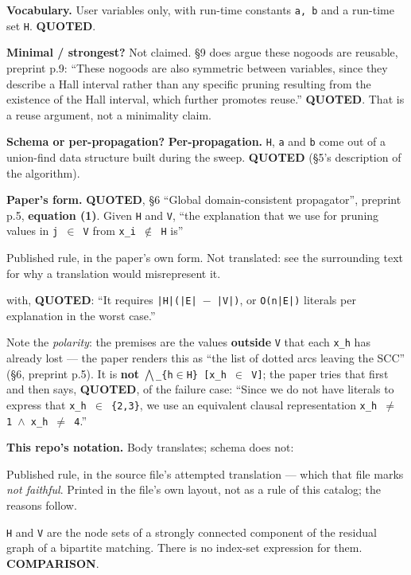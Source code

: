 \documentclass[10pt,a4paper]{article}
\newcommand{\provtag}[2]{{\small\sffamily\bfseries\textcolor{#1}{#2}}}
\newenvironment{pubblock}{%
  \par\smallskip
  \def\FrameCommand{\textcolor{litbar}{\vrule width 2.5pt}\hspace{9pt}}%
  \MakeFramed{\advance\hsize-\width\FrameRestore}}%
  {\endMakeFramed\par\smallskip}
\newcommand{\litsub}[1]{\par\smallskip{\sffamily\bfseries\textcolor{litbar}{#1}\par}}
\newcommand{\rulekind}[1]{\par{\small\sffamily\textcolor{litbar}{#1}\par}}
\newcommand{\litline}[1]{\noindent
  \resizebox{\ifdim\width>\linewidth\linewidth\else\width\fi}{!}{#1}\par}
\begin{document}
\begin{pubblock}
\textbf{Vocabulary.} User variables only, with run-time constants \texttt{a, b} and a run-time set \texttt{H}. \provtag{tagquoted}{QUOTED}.

\textbf{Minimal / strongest?} Not claimed. \S{}9 does argue these nogoods are reusable, preprint p.9: ``These nogoods are also symmetric between variables, since they describe a Hall interval rather than any specific pruning resulting from the existence of the Hall interval, which further promotes reuse.'' \provtag{tagquoted}{QUOTED}. That is a reuse argument, not a minimality claim.

\textbf{Schema or per-propagation?} \textbf{Per-propagation.} \texttt{H}, \texttt{a} and \texttt{b} come out of a union-find data structure built during the sweep. \provtag{tagquoted}{QUOTED} (\S{}5's description of the algorithm).

\par\smallskip
\litsub{Rule 3 --- domain-consistent propagator (R\'egin / SCC), pruning}
\textbf{Paper's form.} \provtag{tagquoted}{QUOTED}, \S{}6 ``Global domain-consistent propagator'', preprint p.5, \textbf{equation (1)}. Given \texttt{H} and \texttt{V}, ``the explanation that we use for pruning values in \texttt{j $\in$ V} from \texttt{x\_i $\notin$ H} is''

\rulekind{Published rule, in the paper's own form. Not translated: see the surrounding text for why a translation would misrepresent it.}
{\raggedright
\litline{\ttfamily\small $\bigwedge$\_\{h$\in$H, d$\in$E\textbackslash{}V\} [x\_h $\neq$ d] $\rightarrow$ [x\_i $\neq$ j]~~~~~~~~~~~~~~~~~~~~~~~~~~~~~~~~~~~~(1)}
\par}
with, \provtag{tagquoted}{QUOTED}: ``It requires \texttt{|H|(|E| $-$ |V|)}, or \texttt{O(n|E|)} literals per explanation in the worst case.''

Note the \emph{polarity}: the premises are the values \textbf{outside} \texttt{V} that each \texttt{x\_h} has already lost --- the paper renders this as ``the list of dotted arcs leaving the SCC'' (\S{}6, preprint p.5). It is \textbf{not} \texttt{$\bigwedge$\_\{h$\in$H\} [x\_h $\in$ V]}; the paper tries that first and then says, \provtag{tagquoted}{QUOTED}, of the failure case: ``Since we do not have literals to express that \texttt{x\_h $\in$ \{2,3\}}, we use an equivalent clausal representation \texttt{x\_h $\neq$ 1 $\wedge$ x\_h $\neq$ 4}.''

\textbf{This repo's notation.} Body translates; schema does not:

\rulekind{Published rule, in the source file's attempted translation --- which that file marks \emph{not faithful}. Printed in the file's own layout, not as a rule of this catalog; the reasons follow.}
{\raggedright
\litline{\ttfamily\small X\_h $\neq$ d,~~$\forall$h $\in$ H,~~$\forall$d $\in$ E\textbackslash{}V}
\litline{\ttfamily\small ------------------------------- $\vdash$~~~~~~~~(AC)}
\litline{\ttfamily\small X\_i $\neq$ j}
\par}
\texttt{H} and \texttt{V} are the node sets of a strongly connected component of the residual graph of a bipartite matching. There is no index-set expression for them. \provtag{tagcomparison}{COMPARISON}.


\end{pubblock}
\end{document}
